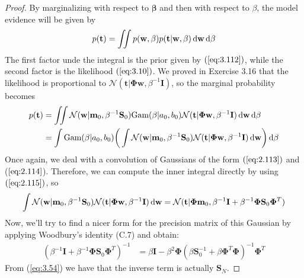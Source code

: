 \begin{proof}
    By marginalizing with respect to $\mathbf{\beta}$ and then
    with respect to $\beta$, the model evidence will be given by
     \[
         p(\mathbf{t}) 
         = \iint p(\mathbf{w}, \beta) p(\mathbf{t} | \mathbf{w}, \beta) \mathop{}\!\mathrm{d} \mathbf{w} 
         \mathop{}\!\mathrm{d}\beta
    \] 
    The first factor unde the integral is the prior given by $(\ref{eq:3.112})$,
    while the second factor is the likelihood $(\ref{eq:3.10})$. We proved
    in Exercise 3.16 that the likelihood is proportional to 
    $\mathcal{N}(\mathbf{t} | \mathbf{\Phi}\mathbf{w}, \beta^{-1}\mathbf{I})$,
    so the marginal probability becomes
    \begin{align*}
         p(\mathbf{t}) 
         &= \iint \mathcal{N}(\mathbf{w} | \mathbf{m}_0, \beta^{-1}\mathbf{S}_0)
            \text{Gam}(\beta | a_0, b_0) 
            \mathcal{N}(\mathbf{t} | \mathbf{\Phi}\mathbf{w}, \beta^{-1}\mathbf{I}) 
            \mathop{}\!\mathrm{d} \mathbf{w}\mathop{}\!\mathrm{d}\beta \\
         &= \int \text{Gam}(\beta | a_0, b_0)
         \bigg(\int 
            \mathcal{N}(\mathbf{w} | \mathbf{m}_0, \beta^{-1}\mathbf{S}_0)
            \mathcal{N}(\mathbf{t} | \mathbf{\Phi}\mathbf{w}, 
                \beta^{-1}\mathbf{I}) \mathop{}\!\mathrm{d} \mathbf{w}\bigg) 
            \mathop{}\!\mathrm{d} \beta
    \end{align*}
    Once again, we deal with a convolution of Gaussians of the form
    $(\ref{eq:2.113})$ and ($\ref{eq:2.114}$). Therefore, we can compute
    the inner integral directly by using $(\ref{eq:2.115})$, so
    \[
         \int 
            \mathcal{N}(\mathbf{w} | \mathbf{m}_0, \beta^{-1}\mathbf{S}_0)
            \mathcal{N}(\mathbf{t} | \mathbf{\Phi}\mathbf{w},
                \beta^{-1}\mathbf{I}) \mathop{}\!\mathrm{d} \mathbf{w}
        = \mathcal{N}(\mathbf{t} | \mathbf{\Phi}\mathbf{m}_0, 
            \beta^{-1}\mathbf{I} + \beta^{-1}\mathbf{\Phi}\mathbf{S}_0\mathbf{\Phi}^T)
    \] 
    Now, we'll try to find a nicer form for the precision matrix 
    of this Gaussian by applying Woodbury's identity (C.7) and obtain:
    \begin{align*}
        (\beta^{-1}\mathbf{I} + \beta^{-1}\mathbf{\Phi}\mathbf{S}_0\mathbf{\Phi}^T)^{-1}
        &= \beta\mathbf{I} - \beta^2\mathbf{\Phi}(\beta\mathbf{S}_0^{-1} 
        + \beta\mathbf{\Phi}^T\mathbf{\Phi})^{-1}\mathbf{\Phi}^T
    \end{align*}
    From (\ref{eq:3.54}) we have that the inverse term is actually $\mathbf{S}_N$.
\end{proof}
